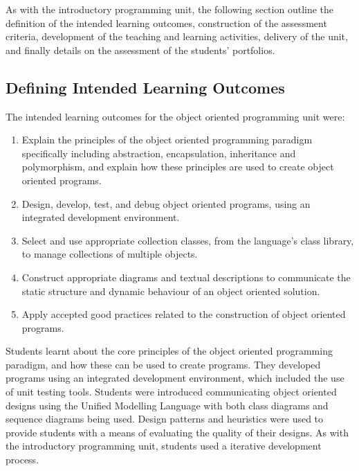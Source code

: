 As with the introductory programming unit, the following section outline the definition of the intended learning outcomes, construction of the assessment criteria, development of the teaching and learning activities, delivery of the unit, and finally details on the assessment of the students' portfolios.

\subsection{Defining Intended Learning Outcomes} %
\label{sub:oop_defining_intended_learning_outcomes}

The intended learning outcomes for the object oriented programming unit were:
\begin{enumerate}
	\item Explain the principles of the object oriented programming paradigm specifically including abstraction, encapsulation, inheritance and polymorphism, and explain how these principles are used to create object oriented programs.
	\item Design, develop, test, and debug object oriented programs, using an integrated development environment.
	\item Select and use appropriate collection classes, from the language's class library, to manage collections of multiple objects.
	\item Construct appropriate diagrams and textual descriptions to communicate the static structure and dynamic behaviour of an object oriented solution.
	\item Apply accepted good practices related to the construction of object oriented programs.
\end{enumerate}

Students learnt about the core principles of the object oriented programming paradigm, and how these can be used to create programs. They developed programs using an integrated development environment, which included the use of unit testing tools. Students were introduced communicating object oriented designs using the Unified Modelling Language \cite{Fowler:2004} with both class diagrams and sequence diagrams being used. Design patterns and heuristics were used to provide students with a means of evaluating the quality of their designs. As with the introductory programming unit, students used a iterative development process. 


